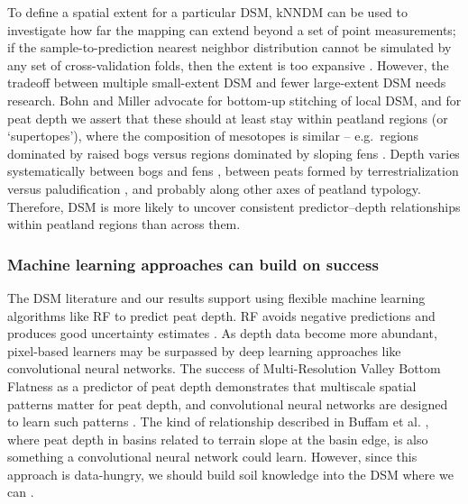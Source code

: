 \documentclass[soil, manuscript]{copernicus}
\begin{document}
To define a spatial extent for a particular DSM, kNNDM can be used to investigate how far the mapping can extend beyond a set of point measurements; if the sample-to-prediction nearest neighbor distribution cannot be simulated by any set of cross-validation folds, then the extent is too expansive \citep{meyerMachineLearningbasedGlobal2022, linnenbrinkKNNDMCVKfold2024}.
However, the tradeoff between multiple small-extent DSM and fewer large-extent DSM needs research.
Bohn and Miller \citeyearpar{bohnLocallyEnhancedDigital2024} advocate for bottom-up stitching of local DSM, and for peat depth we assert that these should at least stay within peatland regions (or `supertopes'), where the composition of mesotopes is similar -- e.g.~regions dominated by raised bogs versus regions dominated by sloping fens \citep{moenNationalAtlasNorway1999, joostenWiseUseMires2002}.
Depth varies systematically between bogs and fens \citep{lindsayPeatlandMireTypes2016}, between peats formed by terrestrialization versus paludification \citep{buffamFillingHolesRegional2010}, and probably along other axes of peatland typology.
Therefore, DSM is more likely to uncover consistent predictor--depth relationships within peatland regions than across them.

\subsubsection{Machine learning approaches can build on success}

The DSM literature and our results support using flexible machine learning algorithms like RF to predict peat depth.
RF avoids negative predictions \citep[c.f.][]{kogantiMappingPeatDepth2023} and produces good uncertainty estimates \citep[our study,][]{vaysseUsingQuantileRegression2017, takoutsingComparingPredictionPerformance2022}.
As depth data become more abundant, pixel-based learners may be surpassed by deep learning approaches like convolutional neural networks.
The success of Multi-Resolution Valley Bottom Flatness as a predictor of peat depth demonstrates that multiscale spatial patterns matter for peat depth, and convolutional neural networks are designed to learn such patterns \citep{borowiecDeepLearningTool2022}.
The kind of relationship described in Buffam et al. \citeyearpar{buffamFillingHolesRegional2010}, where peat depth in basins related to terrain slope at the basin edge, is also something a convolutional neural network could learn.
However, since this approach is data-hungry, we should build soil knowledge into the DSM where we can \citep{minasnySoilScienceInformedMachine2024}.
\end{document}
